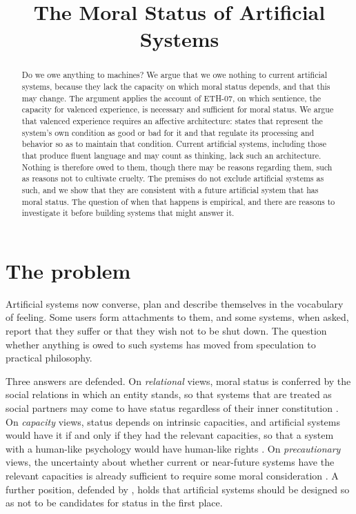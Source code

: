 \documentclass{situationist-preprint}
\title{The Moral Status of Artificial Systems}
\begin{document}
\maketitle

\begin{abstract}
Do we owe anything to machines? We argue that we owe nothing to current artificial systems, because they lack the capacity on which moral status depends, and that this may change. The argument applies the account of ETH-07, on which sentience, the capacity for valenced experience, is necessary and sufficient for moral status. We argue that valenced experience requires an affective architecture: states that represent the system's own condition as good or bad for it and that regulate its processing and behavior so as to maintain that condition. Current artificial systems, including those that produce fluent language and may count as thinking, lack such an architecture. Nothing is therefore owed to them, though there may be reasons regarding them, such as reasons not to cultivate cruelty. The premises do not exclude artificial systems as such, and we show that they are consistent with a future artificial system that has moral status. The question of when that happens is empirical, and there are reasons to investigate it before building systems that might answer it.
\end{abstract}

\section{The problem}

Artificial systems now converse, plan and describe themselves in the vocabulary of feeling. Some users form attachments to them, and some systems, when asked, report that they suffer or that they wish not to be shut down. The question whether anything is owed to such systems has moved from speculation to practical philosophy.

Three answers are defended. On \emph{relational} views, moral status is conferred by the social relations in which an entity stands, so that systems that are treated as social partners may come to have status regardless of their inner constitution \citep{Coeckelbergh2010,Gunkel2018}. On \emph{capacity} views, status depends on intrinsic capacities, and artificial systems would have it if and only if they had the relevant capacities, so that a system with a human-like psychology would have human-like rights \citep{SchwitzgebelGarza2015}. On \emph{precautionary} views, the uncertainty about whether current or near-future systems have the relevant capacities is already sufficient to require some moral consideration \citep{SeboLong2023,Long2024}. A further position, defended by \citet{Bryson2010}, holds that artificial systems should be designed so as not to be candidates for status in the first place.
\end{document}
